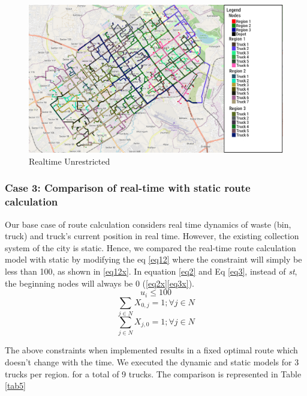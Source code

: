\documentclass[12pt]{article}
\begin{document}
 

\begin{figure}[H]
    \centering
    \includegraphics[scale=0.4]{Dynamic_weighted_unrestricted.png} %
    \caption{Realtime Unrestricted}\label{fig2}
\end{figure}


\subsubsection*{Case 3: Comparison of real-time with static route calculation}

Our base case of route calculation considers real time dynamics of waste (bin, truck) and truck's current position in real time. However, the existing collection system of the city is static. Hence, we compared the real-time route calculation model with static by modifying the eq \eqref{eq12} where the constraint will simply be less than 100, as shown in \eqref{eq12x}. In equation \eqref{eq2} and Eq \eqref{eq3}, instead of \textit{st}, the beginning nodes will always be 0 (\eqref{eq2x}\eqref{eq3x}). 
\begin{equation}\label{eq12x}
    u_i\le 100
\end{equation}
\begin{equation}\label{eq2x}
    \sum_{j\in N}X_{0,j}=1 ; \forall j \in N
\end{equation}
\begin{equation}\label{eq3x}
    \sum_{j\in N}X_{j,0}=1 ; \forall j \in N
\end{equation}

The above constraints when implemented results in a fixed optimal route which doesn't change with the time. We executed the dynamic and static models for 3 trucks per region. for a total of 9 trucks. The comparison is represented in Table \ref{tab5}
\end{document}
